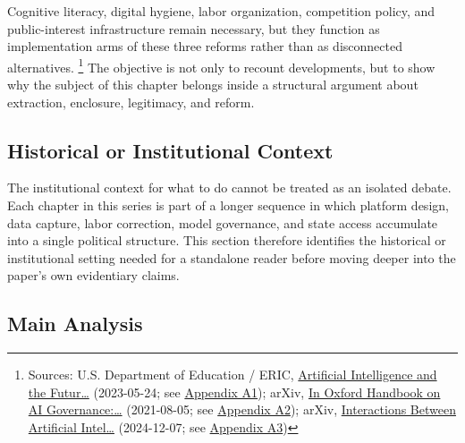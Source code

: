 \documentclass[
  american,
  11pt,
  letterpaper,
]{article}
\begin{document}
Cognitive literacy, digital hygiene, labor organization, competition
policy, and public-interest infrastructure remain necessary, but they
function as implementation arms of these three reforms rather than as
disconnected alternatives. \footnote{Sources: U.S. Department of
  Education / ERIC, \href{https://eric.ed.gov/?id=ED631097}{Artificial
  Intelligence and the Futur\ldots{}} (2023-05-24; see
  \hyperref[ch-10-appendix-a1-artificial-intelligence-and-the-future-of-teaching-and-learning-insights-and-recommendations]{Appendix
  A1}); arXiv, \href{https://arxiv.org/abs/2108.07700}{In Oxford
  Handbook on AI Governance:\ldots{}} (2021-08-05; see
  \hyperref[ch-10-appendix-a2-in-oxford-handbook-on-ai-governance-the-role-of-workers-in-ai-ethics-and-governance]{Appendix
  A2}); arXiv, \href{https://arxiv.org/abs/2412.05761}{Interactions
  Between Artificial Intel\ldots{}} (2024-12-07; see
  \hyperref[ch-10-appendix-a3-interactions-between-artificial-intelligence-and-digital-public-infrastructure-concepts-benefits-and-challenges]{Appendix
  A3})} The objective is not only to recount developments, but to show
why the subject of this chapter belongs inside a structural argument
about extraction, enclosure, legitimacy, and reform.

\subsection{Historical or Institutional
Context}\label{historical-or-institutional-context-10}

The institutional context for what to do cannot be treated as an
isolated debate. Each chapter in this series is part of a longer
sequence in which platform design, data capture, labor correction, model
governance, and state access accumulate into a single political
structure. This section therefore identifies the historical or
institutional setting needed for a standalone reader before moving
deeper into the paper's own evidentiary claims.

\subsection{Main Analysis}\label{main-analysis-10}
\end{document}
